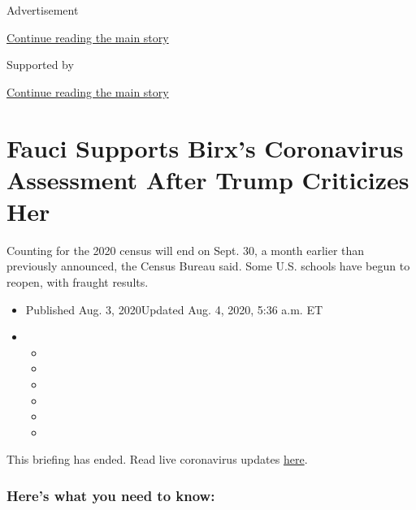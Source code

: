 Advertisement

\protect\hyperlink{after-top}{Continue reading the main story}

Supported by

\protect\hyperlink{after-sponsor}{Continue reading the main story}

\hypertarget{fauci-supports-birxs-coronavirus-assessment-after-trump-criticizes-her}{%
\section{Fauci Supports Birx's Coronavirus Assessment After Trump
Criticizes
Her}\label{fauci-supports-birxs-coronavirus-assessment-after-trump-criticizes-her}}

Counting for the 2020 census will end on Sept. 30, a month earlier than
previously announced, the Census Bureau said. Some U.S. schools have
begun to reopen, with fraught results.

\begin{itemize}
\item
  Published Aug. 3, 2020Updated Aug. 4, 2020, 5:36 a.m. ET
\item
  \begin{itemize}
  \item
  \item
  \item
  \item
  \item
  \item
  \end{itemize}
\end{itemize}

This briefing has ended. Read live coronavirus updates
\href{https://www.nytimes.com/2020/08/04/world/coronavirus-covid-19.html}{here}.

\hypertarget{heres-what-you-need-to-know}{%
\subsubsection{Here's what you need to
know:}\label{heres-what-you-need-to-know}}

